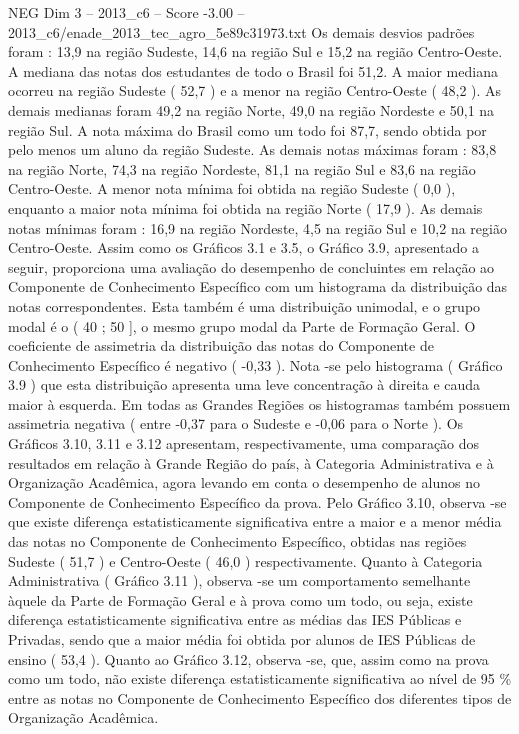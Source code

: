\begin{textsample}{NEG Dim 3 – 2013\_c6 – Score -3.00 – 2013\_c6/enade\_2013\_tec\_agro\_5e89c31973.txt}
Os demais desvios padrões foram : 13,9 na região Sudeste, 14,6 na região Sul e 15,2 na região Centro-Oeste.
A mediana das notas dos estudantes de todo o Brasil foi 51,2.
A maior mediana ocorreu na região Sudeste ( 52,7 ) e a menor na região Centro-Oeste ( 48,2 ).
As demais medianas foram 49,2 na região Norte, 49,0 na região Nordeste e 50,1 na região Sul.
A nota máxima do Brasil como um todo foi 87,7, sendo obtida por pelo menos um aluno da região Sudeste.
As demais notas máximas foram : 83,8 na região Norte, 74,3 na região Nordeste, 81,1 na região Sul e 83,6 na região Centro-Oeste.
A menor nota mínima foi obtida na região Sudeste ( 0,0 ), enquanto a maior nota mínima foi obtida na região Norte ( 17,9 ).
As demais notas mínimas foram : 16,9 na região Nordeste, 4,5 na região Sul e 10,2 na região Centro-Oeste.
Assim como os Gráficos 3.1 e 3.5, o Gráfico 3.9, apresentado a seguir, proporciona uma avaliação do desempenho de concluintes em relação ao Componente de Conhecimento Específico com um histograma da distribuição das notas correspondentes.
Esta também é uma distribuição unimodal, e o grupo modal é o ( 40 ; 50 ], o mesmo grupo modal da Parte de Formação Geral.
O coeficiente de assimetria da distribuição das notas do Componente de Conhecimento Específico é negativo ( -0,33 ).
Nota -se pelo histograma ( Gráfico 3.9 ) que esta distribuição apresenta uma leve concentração à direita e cauda maior à esquerda.
Em todas as Grandes Regiões os histogramas também possuem assimetria negativa ( entre -0,37 para o Sudeste e -0,06 para o Norte ).
Os Gráficos 3.10, 3.11 e 3.12 apresentam, respectivamente, uma comparação dos resultados em relação à Grande Região do país, à Categoria Administrativa e à Organização Acadêmica, agora levando em conta o desempenho de alunos no Componente de Conhecimento Específico da prova.
Pelo Gráfico 3.10, observa -se que existe diferença estatisticamente significativa entre a maior e a menor média das notas no Componente de Conhecimento Específico, obtidas nas regiões Sudeste ( 51,7 ) e Centro-Oeste ( 46,0 ) respectivamente.
Quanto à Categoria Administrativa ( Gráfico 3.11 ), observa -se um comportamento semelhante àquele da Parte de Formação Geral e à prova como um todo, ou seja, existe diferença estatisticamente significativa entre as médias das IES Públicas e Privadas, sendo que a maior média foi obtida por alunos de IES Públicas de ensino ( 53,4 ).
Quanto ao Gráfico 3.12, observa -se, que, assim como na prova como um todo, não existe diferença estatisticamente significativa ao nível de 95 \% entre as notas no Componente de Conhecimento Específico dos diferentes tipos de Organização Acadêmica.

\end{textsample}
